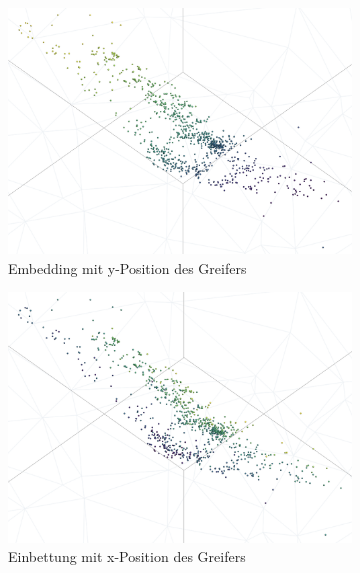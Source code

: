 	\begin{figure}[h]
		\centering
		\begin{subfigure}[c]{0.49\textwidth}			
			\includegraphics[width=1\textwidth,center]{bilder/Hauptteil/MT_Grapple/emb_y.png}
			\caption{Embedding mit y-Position des Greifers}
			\label{img:Emb_y_MT}	
		\end{subfigure}
		\begin{subfigure}[c]{0.49\textwidth}			
			\includegraphics[width=1\textwidth, center]{bilder/Hauptteil/MT_Grapple/emb_x.png}
			\caption{Einbettung mit x-Position des Greifers}
			\label{img:Emb_x_MT}	
		\end{subfigure}
		\begin{subfigure}[c]{0.6\textwidth}			

\end{subfigure}
\end{figure}
